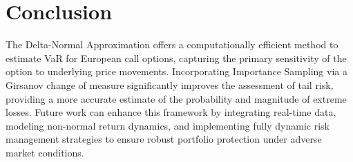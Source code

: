 \documentclass[11pt,a4paper]{article}
\begin{document}
\section{Conclusion}
The Delta-Normal Approximation offers a computationally efficient method to estimate VaR for European call options, capturing the primary sensitivity of the option to underlying price movements. Incorporating Importance Sampling via a Girsanov change of measure significantly improves the assessment of tail risk, providing a more accurate estimate of the probability and magnitude of extreme losses. Future work can enhance this framework by integrating real-time data, modeling non-normal return dynamics, and implementing fully dynamic risk management strategies to ensure robust portfolio protection under adverse market conditions.
\newpage
\printbibliography
\end{document}
